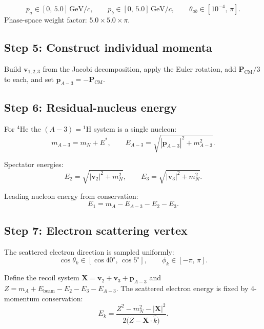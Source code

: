 \documentclass[11pt,a4paper]{article}
\newcommand{\vect}[1]{\bm{#1}}
\newcommand{\unit}[1]{\,\mathrm{#1}}
\newcommand{\GeV}{\unit{GeV}}
\begin{document}
\begin{equation}
  p_{a} \in [0,\,5.0]\GeV/c, \qquad
  p_{b} \in [0,\,5.0]\GeV/c, \qquad
  \theta_{ab} \in [10^{-4},\,\pi].
\end{equation}
Phase-space weight factor: $5.0 \times 5.0 \times \pi$.

\subsection{Step 5: Construct individual momenta}

Build $\vect{v}_{1,2,3}$ from the Jacobi decomposition, apply the Euler
rotation, add $\vect{P}_{\text{CM}}/3$ to each, and set
$\vect{p}_{A{-}3} = -\vect{P}_{\text{CM}}$.

\subsection{Step 6: Residual-nucleus energy}

For $^{4}$He the $(A{-}3) = {}^{1}$H system is a single nucleon:
\begin{equation}
  m_{A{-}3} = m_{N} + E^{*},
  \qquad
  E_{A{-}3} = \sqrt{|\vect{p}_{A{-}3}|^{2} + m_{A{-}3}^{2}}.
\end{equation}

Spectator energies:
\begin{equation}
  E_{2} = \sqrt{|\vect{v}_{2}|^{2} + m_{N}^{2}},
  \qquad
  E_{3} = \sqrt{|\vect{v}_{3}|^{2} + m_{N}^{2}}.
\end{equation}

Leading nucleon energy from conservation:
\begin{equation}
  E_{1} = m_{A} - E_{A{-}3} - E_{2} - E_{3}.
\end{equation}

\subsection{Step 7: Electron scattering vertex}

The scattered electron direction is sampled uniformly:
\begin{equation}
  \cos\theta_{k} \in [\cos 40^{\circ},\,\cos 5^{\circ}],
  \qquad
  \phi_{k} \in [-\pi,\,\pi].
\end{equation}

Define the recoil system $\vect{X} = \vect{v}_{2} + \vect{v}_{3} + \vect{p}_{A{-}3}$
and $Z = m_{A} + E_{\text{beam}} - E_{2} - E_{3} - E_{A{-}3}$.  The
scattered electron energy is fixed by 4-momentum conservation:
\begin{equation}
  E_{k} = \frac{Z^{2} - m_{N}^{2} - |\vect{X}|^{2}}
               {2\bigl(Z - \vect{X}\cdot\hat{k}\bigr)}.
\end{equation}
\end{document}
